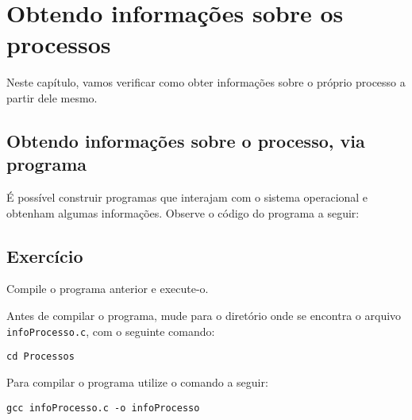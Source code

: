 \chapter{Obtendo informações sobre os processos}
Neste capítulo, vamos verificar como obter informações sobre o próprio processo a partir dele mesmo.

\section{Obtendo informações sobre o processo, via programa}
É possível construir programas que interajam com o sistema operacional e obtenham algumas informações. Observe o código do programa a seguir:



\section{Exercício}
Compile o programa anterior e execute-o.

Antes de compilar o programa, mude para o diretório onde se encontra o arquivo  \texttt{infoProcesso.c}, com o seguinte comando:

\begin{lstlisting}[style=MyBashStyle]
cd Processos
\end{lstlisting}

Para compilar o programa utilize o comando a seguir:
\begin{lstlisting}[style=MyBashStyle]
gcc infoProcesso.c -o infoProcesso
\end{lstlisting}